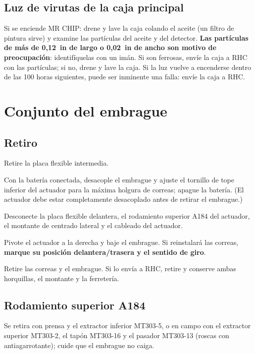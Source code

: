 \subsection{Luz de virutas de la caja principal}

Si se enciende \textsf{MR CHIP}: drene y lave la caja colando el aceite (un filtro de pintura sirve) y examine las partículas del aceite y del detector. \textbf{Las partículas de más de 0,12~in de largo o 0,02~in de ancho son motivo de preocupación}: identifíquelas con un imán. Si son ferrosas, envíe la caja a RHC con las partículas; si no, drene y lave la caja. Si la luz vuelve a encenderse dentro de las 100 horas siguientes, puede ser inminente una falla: envíe la caja a RHC.

\section{Conjunto del embrague}

\subsection{Retiro}

\begin{pasos}
\item Retire la placa flexible intermedia.
\item Con la batería conectada, desacople el embrague y ajuste el tornillo de tope inferior del actuador para la máxima holgura de correas; apague la batería. (El actuador debe estar completamente desacoplado antes de retirar el embrague.)
\item Desconecte la placa flexible delantera, el rodamiento superior A184 del actuador, el montante de centrado lateral y el cableado del actuador.
\item Pivote el actuador a la derecha y baje el embrague. Si reinstalará las correas, \textbf{marque su posición delantera/trasera y el sentido de giro}.
\item Retire las correas y el embrague. Si lo envía a RHC, retire y conserve ambas horquillas, el montante y la ferretería.
\end{pasos}

\subsection{Rodamiento superior A184}

Se retira con prensa y el extractor inferior MT303-5, o en campo con el extractor superior MT303-2, el tapón MT303-16 y el pasador MT303-13 (roscas con antiagarrotante); cuide que el embrague no caiga.

